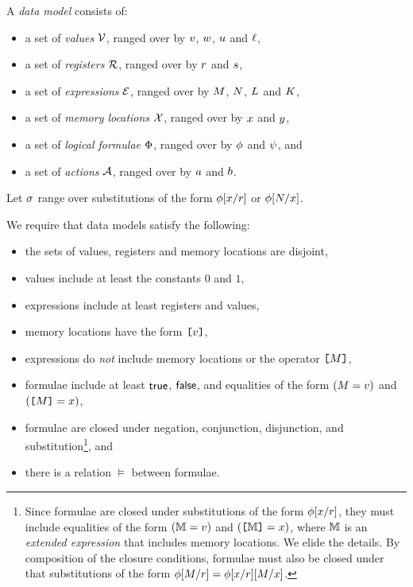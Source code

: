 A \emph{data model} consists of:
\begin{itemize}
\item a set of \emph{values} $\mathcal{V}$, ranged over by
  $v$, $w$, $u$ and $\ell$,
\item a set of \emph{registers} $\mathcal{R}$, ranged over by
  $r$ and $s$,
\item a set of \emph{expressions} $\mathcal{E}$, ranged over by
  $M$, $N$, $L$ and $K$,
\item a set of \emph{memory locations} $\mathcal{X}$, ranged over by $x$ and
  $y$, 
\item a set of \emph{logical formulae} $\Phi$, ranged over by
  $\phi$ and $\psi$, and
\item a set of \emph{actions} $\mathcal{A}$, ranged over by $a$ and $b$.
\end{itemize}

Let $\sigma$ range over substitutions of the form
$\phi[x/r]$ or $\phi[N/x]$.

We require that data models satisfy the following:
\begin{itemize}
\item the sets of values, registers and memory locations are disjoint,
\item values include at least the constants $0$ and $1$,
\item expressions include at least registers and values,
\item memory locations have the form $\texttt{[}v\texttt{]}$,
\item expressions do \emph{not} include memory locations or the operator $\texttt{[}M\texttt{]}$,
\item formulae include at least $\mathsf{true}$, $\mathsf{false}$, and equalities of the form
  $(M=v)$ and $(\texttt{[}M\texttt{]}=x)$,
\item formulae are closed under negation, conjunction, disjunction, and
  substitution\footnote{Since formulae are closed under substitutions of the
    form $\phi[x/r]$, they must include equalities of the form
    $(\mathbb{M}=v)$ and $(\texttt{[}\mathbb{M}\texttt{]}=x)$, where $\mathbb{M}$ is an
    \emph{extended expression} that includes memory locations.  We elide the
    details.  By composition of the closure conditions, formulae must also be
    closed under that substitutions of the form
    $\phi[M/r]=\phi[x/r][M/x]$.}, and
\item there is a relation $\vDash$ between formulae.
\end{itemize}

